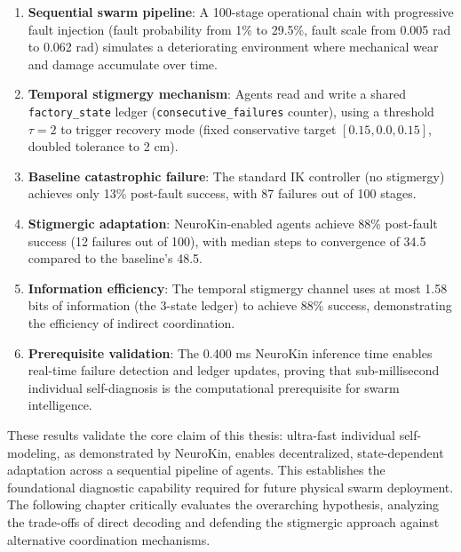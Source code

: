 \documentclass[12pt,a4paper,oneside]{report}
\begin{document}
\begin{enumerate}
    \item \textbf{Sequential swarm pipeline}: A 100-stage operational chain with progressive fault injection (fault probability from 1\% to 29.5\%, fault scale from 0.005 rad to 0.062 rad) simulates a deteriorating environment where mechanical wear and damage accumulate over time.
    \item \textbf{Temporal stigmergy mechanism}: Agents read and write a shared \texttt{factory\_state} ledger (\texttt{consecutive\_failures} counter), using a threshold $\tau = 2$ to trigger recovery mode (fixed conservative target $[0.15, 0.0, 0.15]$, doubled tolerance to 2 cm).
    \item \textbf{Baseline catastrophic failure}: The standard IK controller (no stigmergy) achieves only 13\% post-fault success, with 87 failures out of 100 stages.
    \item \textbf{Stigmergic adaptation}: NeuroKin-enabled agents achieve 88\% post-fault success (12 failures out of 100), with median steps to convergence of 34.5 compared to the baseline's 48.5.
    \item \textbf{Information efficiency}: The temporal stigmergy channel uses at most 1.58 bits of information (the 3-state ledger) to achieve 88\% success, demonstrating the efficiency of indirect coordination.
    \item \textbf{Prerequisite validation}: The 0.400 ms NeuroKin inference time enables real-time failure detection and ledger updates, proving that sub-millisecond individual self-diagnosis is the computational prerequisite for swarm intelligence.
\end{enumerate}

These results validate the core claim of this thesis: ultra-fast individual self-modeling, as demonstrated by NeuroKin, enables decentralized, state-dependent adaptation across a sequential pipeline of agents. This establishes the foundational diagnostic capability required for future physical swarm deployment. The following chapter critically evaluates the overarching hypothesis, analyzing the trade-offs of direct decoding and defending the stigmergic approach against alternative coordination mechanisms.
\end{document}
